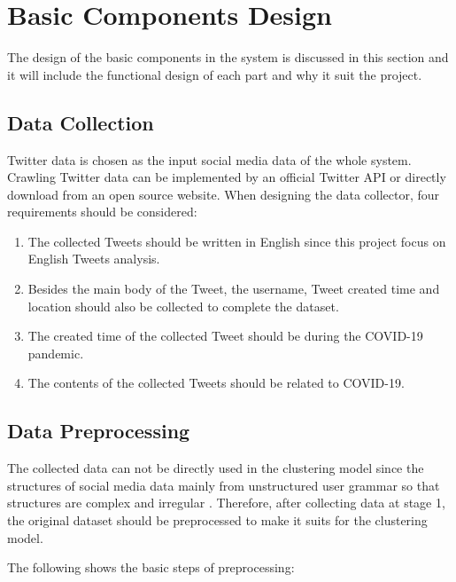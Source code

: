 \section{Basic Components Design}
The design of the basic components in the system is discussed in this section and it will include the functional design of each part and why it suit the project.


\subsection{Data Collection} \label{collection}
Twitter data is chosen as the input social media data of the whole system. Crawling Twitter data can be implemented by an official Twitter API or directly download from an open source website. When designing the data collector, four requirements should be considered:

\begin{enumerate}
    \item The collected Tweets should be written in English since this project focus on English Tweets analysis.
    \item Besides the main body of the Tweet,   the username, Tweet created time and location should also be collected to complete the dataset.
    \item The created time of the collected Tweet should be during the COVID-19 pandemic.
    \item The contents of the collected Tweets should be related to COVID-19.
\end{enumerate}

\subsection{Data Preprocessing} \label{preprocessing}
The collected data can not be directly used in the clustering model since the structures of social media data mainly from unstructured user grammar so that structures are complex and irregular \cite{abidin2019model}. Therefore, after collecting data at stage 1, the original dataset should be preprocessed to make it suits for the clustering model.

The following shows the basic steps of preprocessing:

